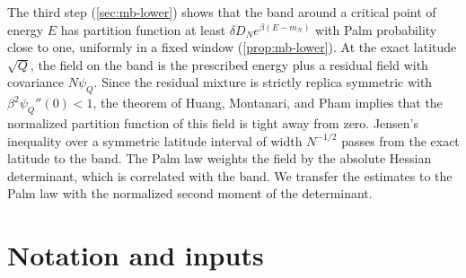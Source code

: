 The third step (\cref{sec:mb-lower}) shows that the band around a critical point of energy $E$ has partition function at least $\delta D_Ne^{\beta(E-m_N)}$ with Palm probability close to one, uniformly in a fixed window (\cref{prop:mb-lower}). At the exact latitude $\sqrt Q$, the field on the band is the prescribed energy plus a residual field with covariance $N\psi_Q$. Since the residual mixture is strictly replica symmetric with $\beta^2\psi_Q''(0)<1$, the theorem of Huang, Montanari, and Pham implies that the normalized partition function of this field is tight away from zero. Jensen's inequality over a symmetric latitude interval of width $N^{-1/2}$ passes from the exact latitude to the band. The Palm law weights the field by the absolute Hessian determinant, which is correlated with the band. We transfer the estimates to the Palm law with the normalized second moment of the determinant.

\section{Notation and inputs}\label{sec:mb-notation}

